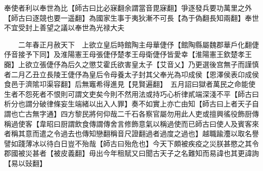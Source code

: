 奉使者利以奉世為比【師古曰比必寐翻余謂當音毘寐翻】爭逐發兵要功萬里之外【師古曰逐競也要一遥翻】為國家生事于夷狄漸不可長【為于偽翻長知兩翻】奉世不宜受封上善望之議以奉世為光禄大夫

　　二年春正月赦天下　上欲立皇后時館陶主母華倢伃【館陶縣屬魏郡華戶化翻倢伃音接予下同】及淮陽憲王母張倢伃楚孝王母衛倢伃皆愛幸【淮陽憲王欽楚孝王嚻】上欲立張倢伃為后久之懲艾霍氏欲害皇太子【艾音乂】乃更選後宫無子而謹慎者二月乙丑立長陵王倢伃為皇后令母養太子封其父奉光為卭成侯【恩澤侯表卬成侯食邑于濟隂卭渠容翻】后無竈希得進見【見賢遍翻】　五月詔曰獄者萬民之命能使生者不怨死者不恨則可謂文吏矣今則不然用法或持巧心析律貳端深淺不平【師古曰析分也謂分破律條妄生端緒以出入人罪】奏不如實上亦亡由知【師古曰上者天子自謂也亡古無字通】四方黎民將何仰哉二千石各察官屬勿用此人吏或擅興徭役飾厨傳稱過使客【韋昭曰厨謂飲食傳謂傳舍言修飾意氣以稱過使而已師古曰使人及賓客來者稱其意而遣之令過去也傳知戀翻稱音尺證翻過者過度之過也】越職踰灋以取名譽譬如踐薄冰以待白日豈不殆哉【師古曰殆危也】今天下頗被疾疫之災朕甚愍之其令郡國被災甚者【被皮義翻】毋出今年租賦又曰聞古天子之名難知而易諱也其更諱詢【易以䜴翻】

